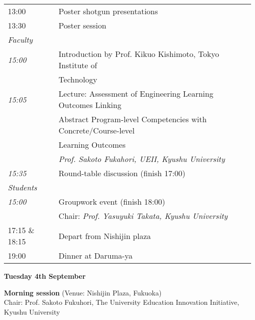 \vspace{1em}
\noindent\begin{tabular}{|l|l|}
    \hline
    13:00   & Poster shotgun presentations \\
    13:30   & Poster session \\
    \emph{Faculty} & \\
    \hspace{1em}\emph{15:00} & Introduction by Prof. Kikuo Kishimoto, Tokyo Institute of \\
                             & Technology \\
    \hspace{1em}\emph{15:05} & Lecture: Assessment of Engineering Learning Outcomes Linking \\
                             & Abstract Program-level Competencies with Concrete/Course-level \\
                             & Learning Outcomes \\  
                             & \emph{Prof. Sakoto Fukahori,   UEII, Kyushu University} \\
    \hspace{1em}\emph{15:35} & Round-table discussion (finish 17:00) \\
    \emph{Students} & \\
    \hspace{1em}\emph{15:00} & Groupwork event (finish 18:00) \\
            & Chair: {\em Prof. Yasuyuki Takata, Kyushu University} \\
    17:15 \& 18:15   & Depart from Nishijin plaza \\
    19:00   & Dinner at Daruma-ya \\
    \hline
\end{tabular}

\newpage
\begin{center}
{\bf \large Tuesday 4th September}
\end{center}
\vspace*{3ex}
{\bf Morning session} (Venue: Nishijin Plaza, Fukuoka)\\
Chair: Prof. Sakoto Fukuhori,  The University Education Innovation Initiative, Kyushu University

